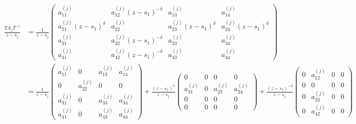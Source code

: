 \documentclass[12pt]{article}
\begin{document}
\[
\begin{aligned}
    \frac{T A_j T^{-1}}{z-s_j} &= \frac{1}{z-s_j}
    \begin{pmatrix}
        a_{11}^{(j)} & a_{12}^{(j)} (z-s_1)^{-\delta} & a_{13}^{(j)} & a_{14}^{(j)} \\[10pt]
        a_{21}^{(j)}(z-s_1)^\delta & a_{22}^{(j)} & a_{23}^{(j)} (z-s_1)^\delta & a_{24}^{(j)} (z-s_1)^\delta\\[10pt]
        a_{31}^{(j)} & a_{32}^{(j)} (z-s_1)^{-\delta} & a_{33}^{(j)} & a_{34}^{(j)} \\[10pt]
        a_{41}^{(j)} & a_{42}^{(j)} (z-s_1)^{-\delta} & a_{43}^{(j)} & a_{44}^{(j)}
    \end{pmatrix} \\[10pt] &=
    \frac{1}{z-s_j}
    \begin{pmatrix}
        a_{11}^{(j)} & 0 & a_{13}^{(j)} & a_{14}^{(j)} \\[10pt]
        0 & a_{22}^{(j)} & 0 & 0\\[10pt]
        a_{31}^{(j)} & 0 & a_{33}^{(j)} & a_{34}^{(j)} \\[10pt]
        a_{41}^{(j)} & 0 & a_{43}^{(j)} & a_{44}^{(j)}
    \end{pmatrix}
    +\frac{(z-s_1)^\delta}{z-s_j}
    \begin{pmatrix}
        0 & 0 & 0 & 0 \\[10pt]
        a_{21}^{(j)} & 0 & a_{23}^{(j)}  & a_{24}^{(j)}\\[10pt]
        0 & 0 & 0 & 0 \\[10pt]
        0 & 0 & 0 & 0
    \end{pmatrix}
    +\frac{ (z-s_1)^{-\delta}}{z-s_j}
    \begin{pmatrix}
        0 & a_{12}^{(j)} & 0 & 0 \\[10pt]
        0 & 0 & 0 & 0 \\[10pt]
        0 & a_{32}^{(j)} & 0 & 0 \\[10pt]
        0 & a_{42}^{(j)} & 0 & 0
    \end{pmatrix}
\end{aligned} \tag{$*$}
\]
\end{document}
